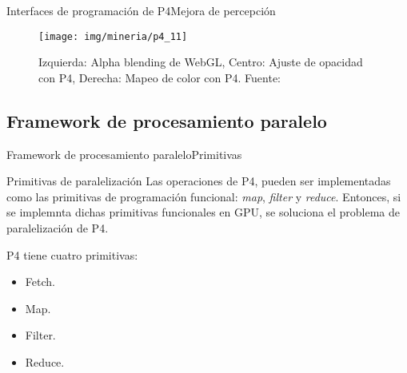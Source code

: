 \documentclass[10pt]{beamer}
\newcommand{\1}{
	\setbeamertemplate{background}{
		\texttt{[image: img/1]}
		\tikz[overlay] \fill[fill opacity=0.75,fill=white] (0,0) rectangle (-\paperwidth,\paperheight);
	}
}
\begin{document}
\begin{frame}{Interfaces de programación de P4}{Mejora de percepción}
\begin{figure}[]
	\centering
	\texttt{[image: img/mineria/p4\_11]}
	\caption{Izquierda: Alpha blending de WebGL, Centro: Ajuste de opacidad con P4, Derecha: Mapeo de color con P4. Fuente: \cite{li2018p4}}
\end{figure}
\end{frame}




\subsection{Framework de procesamiento paralelo}



\begin{frame}{Framework de procesamiento paralelo}{Primitivas}
\begin{block}{Primitivas de paralelización}
	Las operaciones de P4, pueden ser implementadas como las primitivas de programación funcional: \textit{map}, \textit{filter} y \textit{reduce}. Entonces, si se implemnta dichas primitivas funcionales en GPU, se soluciona el problema de paralelización de P4. 
	
	\vspace{0.3cm}
	
	P4 tiene cuatro primitivas:
	
	\begin{itemize}
		\item Fetch.
		\item Map.
		\item Filter.
		\item Reduce.
	\end{itemize}
	
\end{block}
\end{frame}
\end{document}
